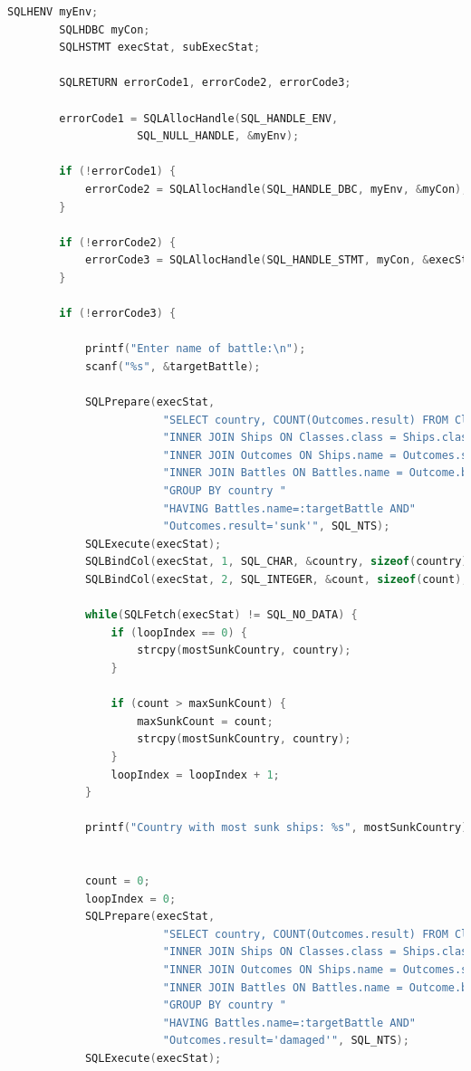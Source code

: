 \documentclass[12pt]{article}
\begin{document}
\begin{enumerate}[1.]
\begin{enumerate}[a)]
\begin{lstlisting}[language=c]
        SQLHENV myEnv;
        SQLHDBC myCon;
        SQLHSTMT execStat, subExecStat;

        SQLRETURN errorCode1, errorCode2, errorCode3;

        errorCode1 = SQLAllocHandle(SQL_HANDLE_ENV,
                    SQL_NULL_HANDLE, &myEnv);

        if (!errorCode1) {
            errorCode2 = SQLAllocHandle(SQL_HANDLE_DBC, myEnv, &myCon);
        }

        if (!errorCode2) {
            errorCode3 = SQLAllocHandle(SQL_HANDLE_STMT, myCon, &execStat)
        }

        if (!errorCode3) {

            printf("Enter name of battle:\n");
            scanf("%s", &targetBattle);

            SQLPrepare(execStat,
                        "SELECT country, COUNT(Outcomes.result) FROM Classes "
                        "INNER JOIN Ships ON Classes.class = Ships.class "
                        "INNER JOIN Outcomes ON Ships.name = Outcomes.ship "
                        "INNER JOIN Battles ON Battles.name = Outcome.battle "
                        "GROUP BY country "
                        "HAVING Battles.name=:targetBattle AND"
                        "Outcomes.result='sunk'", SQL_NTS);
            SQLExecute(execStat);
            SQLBindCol(execStat, 1, SQL_CHAR, &country, sizeof(country), &countryInfo);
            SQLBindCol(execStat, 2, SQL_INTEGER, &count, sizeof(count), &countInfo);

            while(SQLFetch(execStat) != SQL_NO_DATA) {
                if (loopIndex == 0) {
                    strcpy(mostSunkCountry, country);
                }

                if (count > maxSunkCount) {
                    maxSunkCount = count;
                    strcpy(mostSunkCountry, country);
                }
                loopIndex = loopIndex + 1;
            }

            printf("Country with most sunk ships: %s", mostSunkCountry);


            count = 0;
            loopIndex = 0;
            SQLPrepare(execStat,
                        "SELECT country, COUNT(Outcomes.result) FROM Classes "
                        "INNER JOIN Ships ON Classes.class = Ships.class "
                        "INNER JOIN Outcomes ON Ships.name = Outcomes.ship "
                        "INNER JOIN Battles ON Battles.name = Outcome.battle "
                        "GROUP BY country "
                        "HAVING Battles.name=:targetBattle AND"
                        "Outcomes.result='damaged'", SQL_NTS);
            SQLExecute(execStat);


\end{lstlisting}
\end{enumerate}
\end{enumerate}
\end{document}
